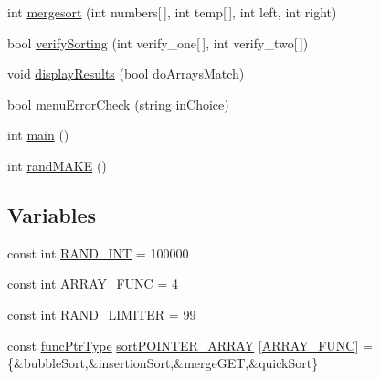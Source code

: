 \begin{DoxyCompactItemize}
\item 
int \hyperlink{_delouth_mansfield-_assn4-_sort_prog_8cpp_a5f5d9f539f726c766f4c454c579f2f6d}{mergesort} (int numbers\mbox{[}$\,$\mbox{]}, int temp\mbox{[}$\,$\mbox{]}, int left, int right)
\item 
bool \hyperlink{_delouth_mansfield-_assn4-_sort_prog_8cpp_ae2cf0cca1e089e83ae98750b96b8cf11}{verifySorting} (int verify\_\-one\mbox{[}$\,$\mbox{]}, int verify\_\-two\mbox{[}$\,$\mbox{]})
\item 
void \hyperlink{_delouth_mansfield-_assn4-_sort_prog_8cpp_a6832ddb090d7bf6c3b962acac96e3951}{displayResults} (bool doArraysMatch)
\item 
bool \hyperlink{_delouth_mansfield-_assn4-_sort_prog_8cpp_a3fcd92b059e256a9f46866c6d1e2b1e4}{menuErrorCheck} (string inChoice)
\item 
int \hyperlink{_delouth_mansfield-_assn4-_sort_prog_8cpp_ae66f6b31b5ad750f1fe042a706a4e3d4}{main} ()
\item 
int \hyperlink{_delouth_mansfield-_assn4-_sort_prog_8cpp_a191743d28b671610e8d78df14b41ed9e}{randMAKE} ()
\end{DoxyCompactItemize}
\subsection*{Variables}
\begin{DoxyCompactItemize}
\item 
const int \hyperlink{_delouth_mansfield-_assn4-_sort_prog_8cpp_a134c2ba56ae9ba89c77a5c0dba9f2124}{RAND\_\-INT} = 100000
\item 
const int \hyperlink{_delouth_mansfield-_assn4-_sort_prog_8cpp_a3b95dd60d5c45f7cc3733769f3d54868}{ARRAY\_\-FUNC} = 4
\item 
const int \hyperlink{_delouth_mansfield-_assn4-_sort_prog_8cpp_ad454298170f7805366a1aa2da04df23a}{RAND\_\-LIMITER} = 99
\item 
const \hyperlink{_mansfield_delouth-_assn4-_sort_prog_8cpp_ae2987d0004dea58df8c833858c0fb370}{funcPtrType} \hyperlink{_delouth_mansfield-_assn4-_sort_prog_8cpp_ae039780346621e190c7726c08c9a1a13}{sortPOINTER\_\-ARRAY} \mbox{[}\hyperlink{_mansfield_delouth-_assn4-_sort_prog_8cpp_a3b95dd60d5c45f7cc3733769f3d54868}{ARRAY\_\-FUNC}\mbox{]} = \{\&bubbleSort,\&insertionSort,\&mergeGET,\&quickSort\}
\end{DoxyCompactItemize}


